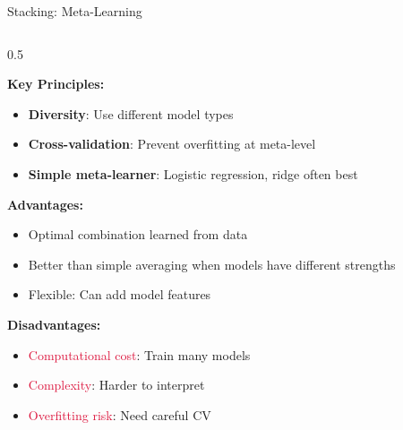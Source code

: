 \begin{frame}{Stacking: Meta-Learning}
\begin{columns}
\begin{column}{0.5\textwidth}
\begin{figure}
\end{figure}

\textbf{Key Principles:}
\begin{itemize}
\item \textbf{Diversity}: Use different model types
\item \textbf{Cross-validation}: Prevent overfitting at meta-level
\item \textbf{Simple meta-learner}: Logistic regression, ridge often best
\end{itemize}

\vspace{0.3cm}
\textbf{Advantages:}
\begin{itemize}
\item \textcolor{forest}{Optimal combination} learned from data
\item \textcolor{forest}{Better than simple averaging} when models have different strengths
\item \textcolor{forest}{Flexible}: Can add model features
\end{itemize}

\textbf{Disadvantages:}
\begin{itemize}
\item \textcolor{crimson}{Computational cost}: Train many models
\item \textcolor{crimson}{Complexity}: Harder to interpret
\item \textcolor{crimson}{Overfitting risk}: Need careful CV
\end{itemize}
\end{column}
\end{columns}
\end{frame}

